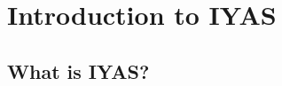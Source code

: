 \documentclass{wileysev}
\begin{document}












\chapter[Introduction to IYAS]
{Introduction to IYAS}

\section[What is IYAS?]{What is IYAS?}
\end{document}
